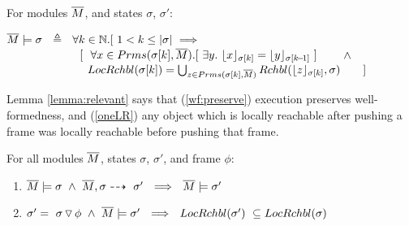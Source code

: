 {\begin{definition}
\label{def:wf:state}
 For modules $\Mtwo$, and  states $\sigma$, $\sigma'$:

$\Mtwo \models \sigma \ \ \triangleq \ \  \forall k\in \mathbb{N}. [ \  1<k\leq \DepthFs {\sigma} \ \Longrightarrow $\\
$\strut \hspace{2.25cm}[\ \ \forall   x \in   \Formals {\RestictTo  \sigma {k}} {\Mtwo}.[\ \exists y. \ \interpret {\RestictTo  \sigma {k}}  {x} = \interpret {\RestictTo  \sigma {k\!-\!1}}  {y} \ ]$ $\hspace{0.3cm} \ \ \  \wedge$  
\\
$\strut \hspace{2.5cm}  {\LRelevantO   {\RestictTo  \sigma {k}} } = \bigcup_{z \in {\Formals {\RestictTo  {\sigma} {k}} {\Mtwo}}}  
{\Relevant { \interpret   {\RestictTo  \sigma {k}}  {z}}\sigma }  \  \ \ \ \ \ ] $
\end{definition}
 
 
 
Lemma  \ref{lemma:relevant} %
says that 
(\ref{wf:preserve}) execution preserves well-formedness, and 
(\ref{oneLR}) any object which is locally reachable after pushing a frame was locally reachable before pushing that frame.
 
\begin{lemma}
\label{lemma:relevant}
\label{l:wf:state}
\label{lemma:push:N}
For all modules $\Mtwo$, states $\sigma$, $\sigma'$,   and frame $\phi$:
\begin{enumerate}
\item
\label{wf:preserve}
$\Mtwo \models \sigma \ \wedge \ {\exec{\Mtwo} {\sigma} {\sigma'}}  \ \    \Longrightarrow \ \ \Mtwo \models \sigma' $
\item
\label{oneLR}
{$ \sigma'= \PushSF {\phi} {\sigma}   \ \wedge  \   \Mtwo \models \sigma' %
 \ \  \Longrightarrow\ \ \LRelevantO {\sigma'}\  \subseteq \LRelevantO   {\sigma}$}

\end{enumerate}
\end{lemma}

}
